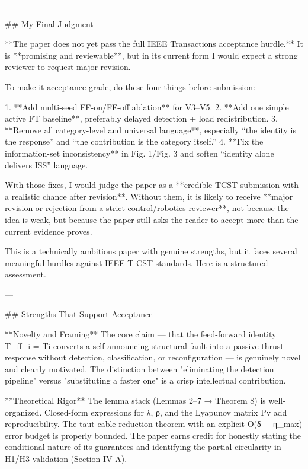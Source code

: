 ---

## My Final Judgment

**The paper does not yet pass the full IEEE Transactions acceptance hurdle.** It is **promising and reviewable**, but in its current form I would expect a strong reviewer to request major revision.

To make it acceptance-grade, do these four things before submission:

1. **Add multi-seed FF-on/FF-off ablation** for V3–V5.
2. **Add one simple active FT baseline**, preferably delayed detection + load redistribution.
3. **Remove all category-level and universal language**, especially “the identity is the response” and “the contribution is the category itself.”
4. **Fix the information-set inconsistency** in Fig. 1/Fig. 3 and soften “identity alone delivers ISS” language.

With those fixes, I would judge the paper as a **credible TCST submission with a realistic chance after revision**. Without them, it is likely to receive **major revision or rejection from a strict control/robotics reviewer**, not because the idea is weak, but because the paper still asks the reader to accept more than the current evidence proves.








This is a technically ambitious paper with genuine strengths, but it faces several meaningful hurdles against IEEE T-CST standards. Here is a structured assessment.

---

## Strengths That Support Acceptance

**Novelty and Framing**
The core claim — that the feed-forward identity T_ff_i = Ti converts a self-announcing structural fault into a passive thrust response without detection, classification, or reconfiguration — is genuinely novel and cleanly motivated. The distinction between "eliminating the detection pipeline" versus "substituting a faster one" is a crisp intellectual contribution.

**Theoretical Rigor**
The lemma stack (Lemmas 2–7 → Theorem 8) is well-organized. Closed-form expressions for λ, ρ, and the Lyapunov matrix Pv add reproducibility. The taut-cable reduction theorem with an explicit O(δ + η_max) error budget is properly bounded. The paper earns credit for honestly stating the conditional nature of its guarantees and identifying the partial circularity in H1/H3 validation (Section IV-A).

